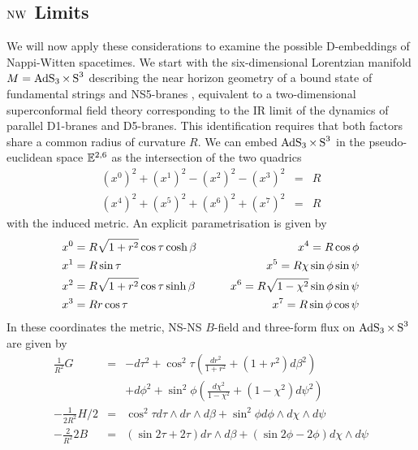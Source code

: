 \subsection{$\operatorname{NW}$ Limits}
\label{ApplNW}
We will now apply these considerations to examine the possible D-embeddings of
Nappi-Witten spacetimes. We start with the six-dimensional Lorentzian manifold
$M=\operatorname{AdS}_3\times\operatorname{S}^3$ describing the near horizon geometry of a bound state
of fundamental strings and NS5-branes \cite{GKS1}, equivalent to a
two-dimensional superconformal field theory corresponding to the IR limit of the
dynamics of parallel D1-branes and D5-branes. This identification requires that
both factors share a common radius of curvature $R$. We can embed
$\operatorname{AdS}_3\times\operatorname{S}^3$ in the pseudo-euclidean space ${\mathbb E}^{2,6}$ as the
intersection of the two quadrics
\begin{eqnarray}
  \label{AdS3quadric}
  \left(x^0\right)^2+\left(x^1\right)^2-\left(x^2\right)^2-\left(x^3\right)^2
  &=&R\\
  \label{S3quadric}
  \left(x^4\right)^2+\left(x^5\right)^2+\left(x^6\right)^2+\left(x^7\right)^2
  &=&R
\end{eqnarray}
with the induced metric. An explicit parametrisation is given by
\begin{eqnarray}
  \label{AdS3S3param}
  x^0&=R\sqrt{1+r^2}\cos\tau\cosh\beta \qquad &x^4=R\cos\phi \\\nonumber
  x^1&=R\sin\tau \qquad\qquad\qquad\qquad &x^5=R\chi\sin\phi\sin\psi \\\nonumber
  x^2&=R\sqrt{1+r^2}\cos\tau\sinh\beta \qquad
  &x^6=R\sqrt{1-\chi^2}\sin\phi\sin\psi \\\nonumber
  x^3&=Rr\cos\tau \qquad\qquad\qquad\qquad &x^7=R\sin\phi\cos\psi
\end{eqnarray}
In these coordinates the metric, NS-NS $B$-field and three-form flux on
$\operatorname{AdS}_3\times\operatorname{S}^3$ are given by
\begin{eqnarray}
  \label{AdS3S3metric}
  \frac 1{R^2}G &=& - d\tau^2 + \cos^2{\tau}\left( \frac{dr^2}{1+r^2} +
    \left(1+r^2\right)d\beta^2\right) \\ \nonumber
  &&+d\phi^2+\sin^2{\phi}\left(\frac{d\chi^2}{1-\chi^2}+
    \left(1-\chi^2\right)d\psi^2\right)\\
  \label{AdS3S3flux}
  -\frac1{2R^2}H/2 &=&
  \cos^2{\tau} d\tau\wedge dr\wedge d\beta + \sin^2{\phi}d\phi\wedge
  d\chi\wedge d\psi\\
  \label{AdS3S3Bfield}
  -\frac2{R^2}2B &=& \left(\sin{2\tau}+2\tau\right)dr\wedge d\beta
  +\left(\sin{2\phi}-2\phi\right)d\chi\wedge d\psi
\end{eqnarray}
